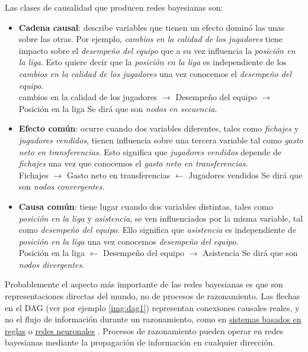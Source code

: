 Las clases de causalidad que producen redes bayesianas son:
\begin{itemize}
    \item \textbf{Cadena causal}: describe variables que tienen un efecto dominó las unas sobre las otras. 
    Por ejemplo, \textit{cambios en la calidad de los jugadores} tiene impacto sobre el \textit{desempeño 
    del equipo} que a su vez influencia la \textit{posición en la liga}. 
    Esto quiere decir que la \textit{posición en la liga} es independiente de los \textit{cambios en la 
    calidad de los jugadores} una vez conocemos el \textit{desempeño del equipo}.\\
    cambios en la calidad de los jugadores $\rightarrow$ Desempeño del equipo $\rightarrow$ Posición en la 
    liga
    Se dirá que son {\em nodos en secuencia}. \label{nodos-secuencia}
    \item \textbf{Efecto común}: ocurre cuando dos variables diferentes, tales como \textit{fichajes} y \textit{jugadores vendidos}, tienen influencia sobre una tercera variable tal como 
    \textit{gasto neto en transferencias}. Esto significa que \textit{jugadores vendidos} depende de \textit{fichajes} una vez que conocemos el \textit{gasto neto en transferencias}.\\
    Fichajes $\rightarrow$ Gasto neto en transferencias $\leftarrow$ Jugadores vendidos 
    Se dirá que son {\em nodos convergentes}. \label{nodos-conv}   
    \item \textbf{Causa común}: tiene lugar cuando dos variables distintas, tales como \textit{posición en la liga} y \textit{asistencia}, se ven influenciados por la misma variable, tal 
    como \textit{desempeño del equipo}. Ello significa que \textit{asistencia} es independiente de \textit{posición en la liga} una vez conocemos \textit{desempeño del equipo}.\\
    Posición en la liga $\leftarrow$ Desempeño del equipo $\rightarrow$ Asistencia
    Se dirá que son {\em nodos divergentes}. \label{nodos-div}
\end{itemize}

Probablemente el aspecto más importante de las redes bayesianas es que son representaciones directas del mundo, no de procesos de 
razonamiento. Las flechas en el DAG (ver por ejemplo \ref{img:dag1}) representan conexiones causales reales, y no el flujo de información 
durante un razonamiento, como en \href{http://personales.upv.es/ccarrasc/doc/SRP-16.htm}{sistemas basados en reglas} o 
\href{https://www.frro.utn.edu.ar/repositorio/catedras/quimica/5_anio/orientadora1/monograias/matich-redesneuronales.pdf}{redes neuronales} \cite{pearl-and-rusell}.
Procesos de razonamiento pueden operar en redes bayesianas mediante la propagación de información en cualquier dirección.

